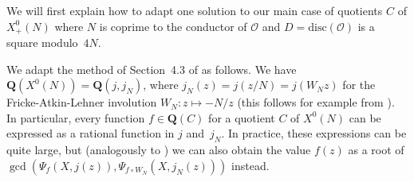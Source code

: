 \documentclass{amsart}
\newcommand{\QQ}{\mathbf{Q}}
\newcommand{\mc}{\mathcal}
\newcommand{\xnul}[1]{X^0(#1)}
\newcommand{\xnulN}{\xnul{N}}
\newcommand{\xplus}[1]{X^0_+(#1)}
\newcommand{\xplusN}{\xplus{N}}
\numberwithin{equation}{section}
\theoremstyle{definition}
\begin{document}
    We will first explain how to adapt one solution to our
    main case of quotients $C$ of $\xplusN$ where $N$ is coprime
    to the conductor of $\mc{O}$ and $D=\mathrm{disc}(\mc{O})$
    is a square modulo~$4N$.
    
    We adapt the method of Section~4.3 of \cite{enge-sutherland2010} as follows.
    We have $\QQ(\xnulN) = \QQ(j,j_N)$, where
    $j_N(z) = j(z/N) = j(W_N z)$
    for the Fricke-Atkin-Lehner involution $W_N : z\mapsto -N/z$
    (this follows for example from \cite[Proposition~6.9]{shimura1971}).
%
%
%    
%    
    In particular, every function $f\in\QQ(C)$ for a quotient $C$ of $\xnulN$
    can be expressed as a rational function in $j$ and~$j_N$.
    In practice, these expressions can be quite large, but (analogously to \cite[Lemma~2]{enge-sutherland2010})
    we can also obtain the value $f(z)$ as a root of $\gcd(\Psi_{f}(X,j(z)),\Psi_{f\circ W_N}(X,j_N(z)))$
    instead.
    
\end{document}
